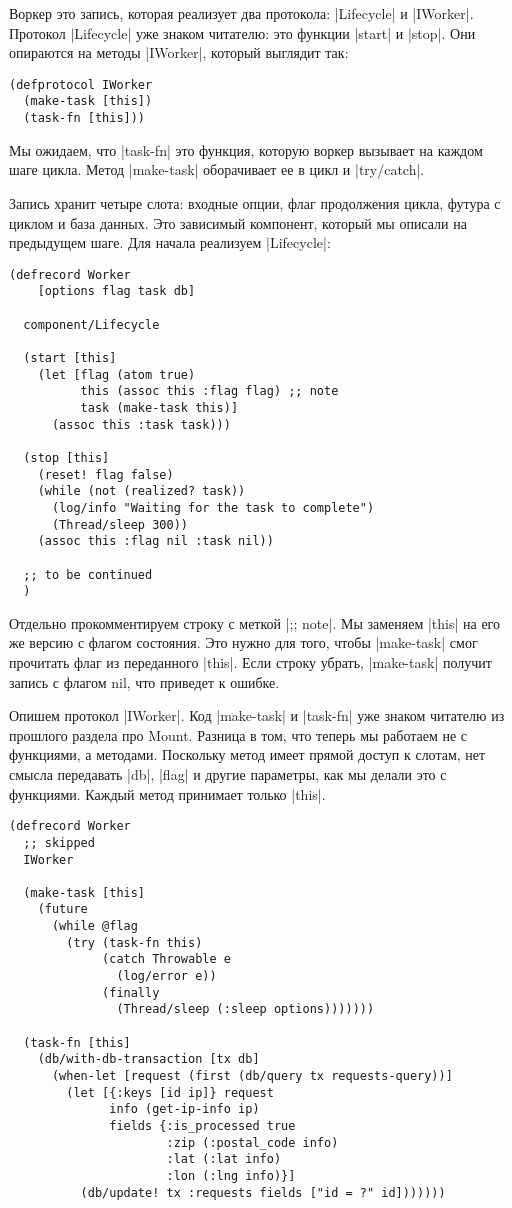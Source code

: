 Воркер это запись, которая реализует два протокола: \spverb|Lifecycle| и
\spverb|IWorker|. Протокол \spverb|Lifecycle| уже знаком читателю: это функции \spverb|start| и
\spverb|stop|. Они опираются на методы \spverb|IWorker|, который выглядит так:

\begin{verbatim}
(defprotocol IWorker
  (make-task [this])
  (task-fn [this]))
\end{verbatim}

Мы ожидаем, что \spverb|task-fn| это функция, которую воркер вызывает на каждом шаге
цикла. Метод \spverb|make-task| оборачивает ее в цикл и \spverb|try/catch|.

Запись хранит четыре слота: входные опции, флаг продолжения цикла, футура с
циклом и база данных. Это зависимый компонент, который мы описали на предыдущем
шаге. Для начала реализуем \spverb|Lifecycle|:

\begin{verbatim}
(defrecord Worker
    [options flag task db]

  component/Lifecycle

  (start [this]
    (let [flag (atom true)
          this (assoc this :flag flag) ;; note
          task (make-task this)]
      (assoc this :task task)))

  (stop [this]
    (reset! flag false)
    (while (not (realized? task))
      (log/info "Waiting for the task to complete")
      (Thread/sleep 300))
    (assoc this :flag nil :task nil))

  ;; to be continued
  )
\end{verbatim}

Отдельно прокомментируем строку с меткой \spverb|;; note|. Мы заменяем \spverb|this| на его же
версию с флагом состояния. Это нужно для того, чтобы \spverb|make-task| смог прочитать
флаг из переданного \spverb|this|. Если строку убрать, \spverb|make-task| получит запись с
флагом nil, что приведет к ошибке.

Опишем протокол \spverb|IWorker|. Код \spverb|make-task| и \spverb|task-fn| уже знаком читателю из
прошлого раздела про Mount. Разница в том, что теперь мы работаем не с
функциями, а методами. Поскольку метод имеет прямой доступ к слотам, нет смысла
передавать \spverb|db|, \spverb|flag| и другие параметры, как мы делали это с
функциями. Каждый метод принимает только \spverb|this|.

\begin{verbatim}
(defrecord Worker
  ;; skipped
  IWorker

  (make-task [this]
    (future
      (while @flag
        (try (task-fn this)
             (catch Throwable e
               (log/error e))
             (finally
               (Thread/sleep (:sleep options)))))))

  (task-fn [this]
    (db/with-db-transaction [tx db]
      (when-let [request (first (db/query tx requests-query))]
        (let [{:keys [id ip]} request
              info (get-ip-info ip)
              fields {:is_processed true
                      :zip (:postal_code info)
                      :lat (:lat info)
                      :lon (:lng info)}]
          (db/update! tx :requests fields ["id = ?" id]))))))
\end{verbatim}

